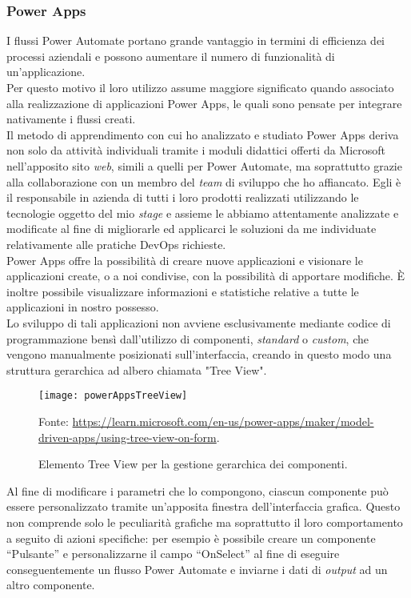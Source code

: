 \subsubsection*{Power Apps}
I flussi Power Automate portano grande vantaggio in termini di efficienza dei processi aziendali e possono aumentare il numero di funzionalità di un'applicazione.\\
Per questo motivo il loro utilizzo assume maggiore significato quando associato alla realizzazione di applicazioni Power Apps, le quali sono pensate per integrare nativamente i flussi creati.\\
Il metodo di apprendimento con cui ho analizzato e studiato Power Apps deriva non solo da attività individuali tramite i moduli didattici offerti da Microsoft nell'apposito sito \emph{web}, simili a quelli per Power Automate, ma soprattutto grazie alla collaborazione con un membro del \emph{team} di sviluppo che ho affiancato. Egli è il responsabile in azienda di tutti i loro prodotti realizzati utilizzando le tecnologie oggetto del mio \emph{stage} e assieme le abbiamo attentamente analizzate e modificate al fine di migliorarle ed applicarci le soluzioni da me individuate relativamente alle pratiche \gls{DevOps} richieste.\\
Power Apps offre la possibilità di creare nuove applicazioni e visionare le applicazioni create, o a noi condivise, con la possibilità di apportare modifiche. È inoltre possibile visualizzare informazioni e statistiche relative a tutte le applicazioni in nostro possesso.\\
Lo sviluppo di tali applicazioni non avviene esclusivamente mediante codice di programmazione bensì dall'utilizzo di componenti, \emph{standard} o \emph{custom}, che vengono manualmente posizionati sull'interfaccia, creando in questo modo una struttura gerarchica ad albero chiamata "Tree View".
\begin{figure}[htbp] 
    \centering 
    \texttt{[image: powerAppsTreeView]} 
    \caption{Elemento Tree View per la gestione gerarchica dei componenti.}
    \label{fig:powerAppsTreeView}
    \vspace{1mm}
    Fonte: \url{https://learn.microsoft.com/en-us/power-apps/maker/model-driven-apps/using-tree-view-on-form}.
\end{figure}
\newpage \noindent Al fine di modificare i parametri che lo compongono, ciascun componente può essere personalizzato tramite un'apposita finestra dell'interfaccia grafica. Questo non comprende solo le peculiarità grafiche ma soprattutto il loro comportamento a seguito di azioni specifiche: per esempio è possibile creare un componente “Pulsante” e personalizzarne il campo “OnSelect” al fine di eseguire conseguentemente un flusso Power Automate e inviarne i dati di \emph{output} ad un altro componente.\\
